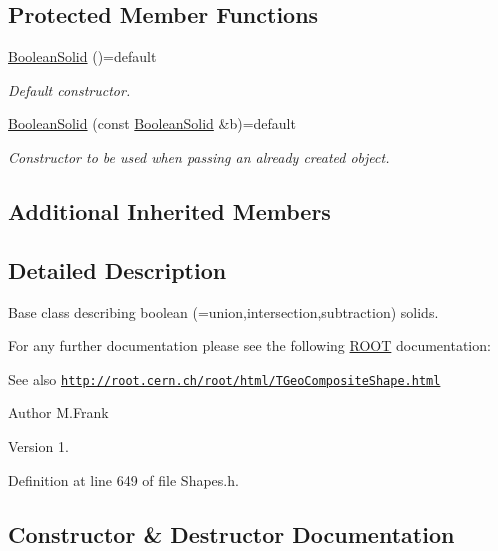 \subsection*{Protected Member Functions}
\begin{DoxyCompactItemize}
\item 
\hyperlink{class_d_d4hep_1_1_geometry_1_1_boolean_solid_afa8cdd2713257acafad7844526083cbc}{Boolean\+Solid} ()=default
\begin{DoxyCompactList}\small\item\em Default constructor. \end{DoxyCompactList}\item 
\hyperlink{class_d_d4hep_1_1_geometry_1_1_boolean_solid_a92624228e4cae24938acb5c823c22add}{Boolean\+Solid} (const \hyperlink{class_d_d4hep_1_1_geometry_1_1_boolean_solid}{Boolean\+Solid} \&b)=default
\begin{DoxyCompactList}\small\item\em Constructor to be used when passing an already created object. \end{DoxyCompactList}\end{DoxyCompactItemize}
\subsection*{Additional Inherited Members}


\subsection{Detailed Description}
Base class describing boolean (=union,intersection,subtraction) solids. 

For any further documentation please see the following \hyperlink{namespace_r_o_o_t}{R\+O\+OT} documentation\+: \begin{DoxySeeAlso}{See also}
\href{http://root.cern.ch/root/html/TGeoCompositeShape.html}{\tt http\+://root.\+cern.\+ch/root/html/\+T\+Geo\+Composite\+Shape.\+html}
\end{DoxySeeAlso}
\begin{DoxyAuthor}{Author}
M.\+Frank 
\end{DoxyAuthor}
\begin{DoxyVersion}{Version}
1. 
\end{DoxyVersion}


Definition at line 649 of file Shapes.\+h.



\subsection{Constructor \& Destructor Documentation}
\hypertarget{class_d_d4hep_1_1_geometry_1_1_boolean_solid_afa8cdd2713257acafad7844526083cbc}{}\label{class_d_d4hep_1_1_geometry_1_1_boolean_solid_afa8cdd2713257acafad7844526083cbc} 
